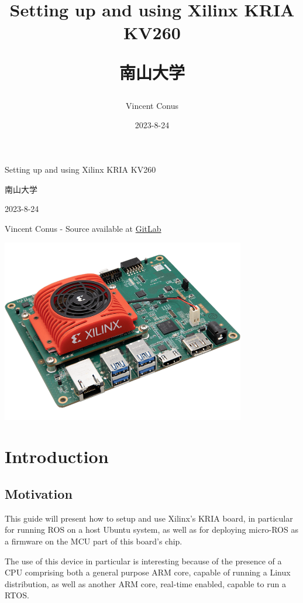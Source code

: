 \documentclass[10pt]{article}
\author{Vincent Conus}
\date{2023-8-24}
\title{Setting up and using Xilinx KRIA KV260\\\medskip
\large \begin{CJK}{UTF8}{min}南山大学\end{CJK}}
\newcommand{\gitlab}[1]{%
\href{#1}{GitLab \faGitlab}}
\begin{document}
\begin{titlepage}
\centering
{\LARGE Setting up and using Xilinx KRIA KV260 \par }
\vspace{5mm}
{\large \begin{CJK}{UTF8}{min}南山大学\end{CJK} \par}
\vspace{1cm}
{\large 2023-8-24 \par}
\vspace{2cm}
{\large Vincent Conus -  Source available at \gitlab{https://gitlab.com/sunoc/xilinx-kria-kv260-documentation} \par}
\vspace{3cm}
\includegraphics[width=0.8\textwidth]{./img/board}\end{titlepage}
\tableofcontents
\pagebreak
\section{Introduction}
\label{sec:org4dc4560}

\subsection{Motivation}
\label{sec:org4d7a3e9}
This guide will present how to setup and use Xilinx's KRIA board, in particular
for running ROS on a host Ubuntu system, as well as for deploying
micro-ROS as a firmware on the MCU part of this board's chip.

The use of this device in particular is interesting because of the presence
of a CPU comprising both a general purpose ARM core, capable of running
a Linux distribution, as well as another ARM core, real-time enabled,
capable to run a RTOS.
\end{document}

